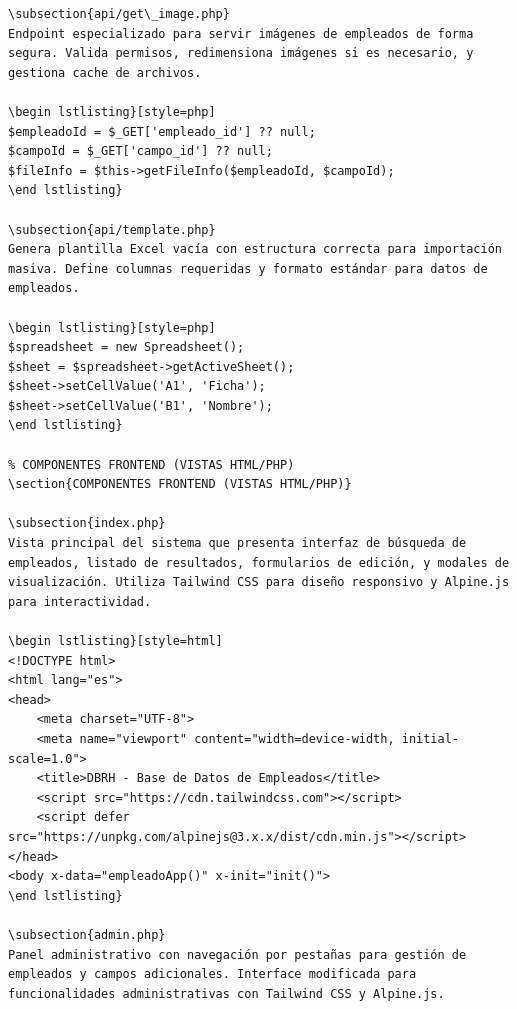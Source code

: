 \documentclass[12pt,a4paper]{article}
\begin{document}
\begin{lstlisting}[style=php]
\subsection{api/get\_image.php}
Endpoint especializado para servir imágenes de empleados de forma segura. Valida permisos, redimensiona imágenes si es necesario, y gestiona cache de archivos.

\begin lstlisting}[style=php]
$empleadoId = $_GET['empleado_id'] ?? null;
$campoId = $_GET['campo_id'] ?? null;
$fileInfo = $this->getFileInfo($empleadoId, $campoId);
\end lstlisting}

\subsection{api/template.php}
Genera plantilla Excel vacía con estructura correcta para importación masiva. Define columnas requeridas y formato estándar para datos de empleados.

\begin lstlisting}[style=php]
$spreadsheet = new Spreadsheet();
$sheet = $spreadsheet->getActiveSheet();
$sheet->setCellValue('A1', 'Ficha');
$sheet->setCellValue('B1', 'Nombre');
\end lstlisting}

% COMPONENTES FRONTEND (VISTAS HTML/PHP)
\section{COMPONENTES FRONTEND (VISTAS HTML/PHP)}

\subsection{index.php}
Vista principal del sistema que presenta interfaz de búsqueda de empleados, listado de resultados, formularios de edición, y modales de visualización. Utiliza Tailwind CSS para diseño responsivo y Alpine.js para interactividad.

\begin lstlisting}[style=html]
<!DOCTYPE html>
<html lang="es">
<head>
    <meta charset="UTF-8">
    <meta name="viewport" content="width=device-width, initial-scale=1.0">
    <title>DBRH - Base de Datos de Empleados</title>
    <script src="https://cdn.tailwindcss.com"></script>
    <script defer src="https://unpkg.com/alpinejs@3.x.x/dist/cdn.min.js"></script>
</head>
<body x-data="empleadoApp()" x-init="init()">
\end lstlisting}

\subsection{admin.php}
Panel administrativo con navegación por pestañas para gestión de empleados y campos adicionales. Interface modificada para funcionalidades administrativas con Tailwind CSS y Alpine.js.


\end{lstlisting}
\end{document}
